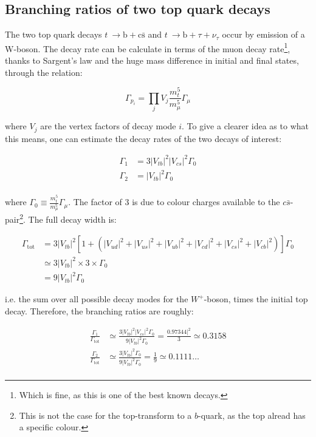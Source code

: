 \documentclass[11pt,a4paper]{article}
\begin{document}
\subsection{Branching ratios of two top quark decays}
The two top quark decays $t\:\rightarrow\text{b}+\text{c}\bar{\text{s}}$ and $t\:\rightarrow\text{b}+\tau+\nu_\tau$ occur by emission of a W-boson. The decay rate can be calculate in terms of the muon decay rate\footnote{Which is fine, as this is one of the best known decays.}, thanks to Sargent's law and the huge mass difference in initial and final states, through the relation:

\begin{equation}
	\Gamma_{p_i} = \prod_j V_j \frac{m_t^5}{m_\mu^5}\Gamma_\mu
\end{equation}

where $V_j$ are the vertex factors of decay mode $i$. To give a clearer idea as to what this means, one can estimate the decay rates of the two decays of interest:

\begin{align}
	\Gamma_1 &= 3|V_{tb}|^2|V_{cs}|^2\Gamma_0\\
	\Gamma_2 &= |V_{tb}|^2\Gamma_0\\
\end{align}

where $\Gamma_0 \equiv \frac{m_t^5}{m_\mu^5}\Gamma_\mu$. The factor of 3 is due to colour charges available to the $c\bar{s}$-pair\footnote{This is not the case for the top-transform to a $b$-quark, as the top alread has a specific colour.}. The full decay width is:

\begin{align}
	\Gamma_{\text{tot}} &= 3|V_{tb}|^2\left[1+\left(|V_{ud}|^2+|V_{us}|^2+|V_{ub}|^2+|V_{cd}|^2+|V_{cs}|^2+|V_{cb}|^2\right)\right]\Gamma_0\\
	 &\simeq 3|V_{tb}|^2\times 3\times\Gamma_0\\
	 &= 9|V_{tb}|^2\Gamma_0
\end{align}

i.e. the sum over all possible decay modes for the $W^+$-boson, times the initial top decay. Therefore, the branching ratios are roughly:

\begin{align*}
	\frac{\Gamma_1}{\Gamma_{\text{tot}}} &\simeq \frac{3|V_{tb}|^2|V_{cs}|^2\Gamma_0}{9|V_{tb}|^2\Gamma_0} = \frac{0.97344|^2}{3} \simeq 0.3158\\
	\frac{\Gamma_2}{\Gamma_{\text{tot}}} &\simeq \frac{3|V_{tb}|^2\Gamma_0}{9|V_{tb}|^2\Gamma_0} = \frac{1}{9} \simeq 0.1111\ldots\\
\end{align*}
\end{document}
